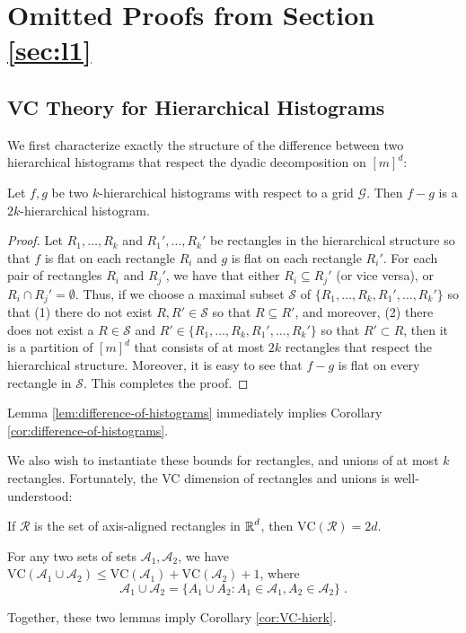 \documentclass[final,12pt]{colt2018} %
\newcommand{\rect}{\mathcal{R}}
\newcommand{\calG}{\mathcal{G}}
\newcommand{\VC}{\mathrm{VC}}
\begin{document}
\section{Omitted Proofs from Section \ref{sec:l1}}
\label{sec:l1-app}

\subsection{VC Theory for Hierarchical Histograms}
We first characterize exactly the structure of the difference between two hierarchical histograms that respect the dyadic decomposition on $[m]^d$:
\begin{lemma}
\label{lem:difference-of-histograms}
Let $f, g$ be two $k$-hierarchical histograms with respect to a grid $\calG$.
Then $f - g$ is a $2k$-hierarchical histogram.
\end{lemma}
\begin{proof}
Let $R_1, \ldots, R_k$ and $R_1', \ldots, R_k'$ be rectangles in the hierarchical structure so that $f$ is flat on each rectangle $R_i$ and $g$ is flat on each rectangle $R_i'$.
For each pair of rectangles $R_i$ and $R_j'$, we have that either $R_i \subseteq R_j'$ (or vice versa), or $R_i \cap R_j' = \emptyset$.
Thus, if we choose a maximal subset $\mathcal{S}$ of $\{R_1, \ldots, R_k, R_1', \ldots, R_k'\}$ so that (1) there do not exist $R, R' \in \mathcal{S}$ so that $R \subseteq R'$, and moreover, (2) there does not exist a $R \in \mathcal{S}$ and $R' \in \{R_1, \ldots, R_k, R_1', \ldots, R_k'\}$ so that $R' \subset R$, then it is a partition of $[m]^d$ that consists of at most $2k$ rectangles that respect the hierarchical structure.
Moreover, it is easy to see that $f - g$ is flat on every rectangle in $\mathcal{S}$.
This completes the proof.
\end{proof}

\noindent Lemma \ref{lem:difference-of-histograms} immediately implies Corollary \ref{cor:difference-of-histograms}.

We also wish to instantiate these bounds for rectangles, and unions of at most $k$ rectangles.
Fortunately, the VC dimension of rectangles and unions is well-understood:
\begin{lemma}
If $\rect$ is the set of axis-aligned rectangles in $\operatorname{\mathbb{R}}^d$, then $\VC (\rect) = 2d$.
\end{lemma}

\begin{lemma}
For any two sets of sets $\mathcal{A}_1, \mathcal{A}_2$, we have $\VC (\mathcal{A}_1 \cup \mathcal{A}_2) \leq \VC (\mathcal{A}_1) + \VC (\mathcal{A}_2) + 1$, where
\[
\mathcal{A}_1 \cup \mathcal{A}_2 = \{A_1 \cup A_2 : A_1 \in \mathcal{A}_1, A_2 \in \mathcal{A}_2 \} \; .
\]
\end{lemma}
Together, these two lemmas imply Corollary \ref{cor:VC-hierk}.
\end{document}
